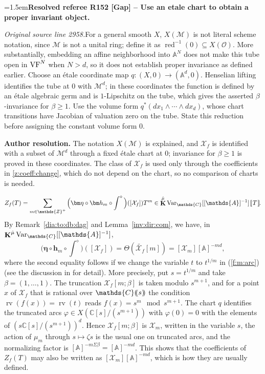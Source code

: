 \documentclass[12pt]{amsart}
\newcommand{\ResolvedRefereeRemark}[5]{%
  \par\medskip\begingroup\normalfont\small\color{gray}%
  \emergencystretch=1.5em\noindent\textbf{Resolved referee R#1 [#2] -- #3.}\par\nobreak\noindent #4\par
  \medskip\color{ResolutionGreen}\noindent\textbf{Author resolution.} #5\par
  \endgroup\medskip
}
\theoremstyle{plain}
\theoremstyle{definition}
\theoremstyle{remark}
\numberwithin{equation}{section}
\theoremstyle{plain}
\newcommand{\VF}{\textup{VF}}
\newcommand{\MM}{\mdl M}
\newcommand{\OO}{\mdl O}
\newcommand{\Z}{\mathds{Z}}
\newcommand{\A}{\mathds{A}}
\newcommand{\C}{\mathds{C}}
\newcommand{\0}{\emptyset}
\newcommand{\dbra}[1]{%
  \,[\mkern-6.8mu[\, #1 \,]\mkern-6.8mu]}
\newcommand{\dpar}[1]{%
   (\mkern-4mu (#1 )\mkern-4mu )}
\newcommand{\mdl}[1]{\mathcal{#1}}  %
\newcommand{\efun}{\longmapsto}
\DeclareMathOperator{\rv}{rv}
\DeclareMathOperator{\ggk}{\mathbf{K}}
\newcommand{\var}{\textup{Var}}
\newcommand{\gmv}{\ggk^{\hat \mu}\var_{\C}}
\begin{document}
\ResolvedRefereeRemark{152}{Gap}{Use an etale chart to obtain a proper invariant object}{%
\textit{Original source line 2958.}\quad For a general smooth $X$, $X(\MM)$ is not literal scheme notation, since $\MM$ is not a unital ring; define it as $\operatorname{red}^{-1}(0)\subseteq X(\OO)$. More substantially, embedding an affine neighborhood into $\A^N$ does not make this tube open in $\VF^N$ when $N>d$, so it does not establish proper invariance as defined earlier. Choose an \'etale coordinate map $q:(X,0)\to(\A^d,0)$. Henselian lifting identifies the tube at $0$ with $\MM^d$; in these coordinates the function is defined by an \'etale algebraic germ and is $1$-Lipschitz on the tube, which gives the asserted $\beta$-invariance for $\beta\geq1$. Use the volume form $q^*(dx_1\wedge\cdots\wedge dx_d)$, whose chart transitions have Jacobian of valuation zero on the tube. State this reduction before assigning the constant volume form $0$.
}{The notation $X(\MM)$ is explained, and $\mdl X_f$ is identified with a subset of $\MM^d$ through a fixed \'etale chart at $0$; invariance for $\beta\geq1$ is proved in these coordinates. The class of $\mdl X_f$ is used only through the coefficients in \eqref{z:coeff:change}, which do not depend on the chart, so no comparison of charts is needed.}
\begin{equation}\label{def:zeta}
Z_f(T) = \sum_{m \in \Z^+} \Big(\bm \eta \circ \bm h_m \circ \int^{\diamond} \Big)([\mdl X_f]) T^m \in \gmv[[\A]^{-1}] \dbra T.
\end{equation}
By Remark~\ref{dia:to:db:dag} and Lemma~\ref{inv:dir:com}, we have, in $\gmv[[\A]^{-1}]$,
\begin{equation}\label{z:coeff:change}
 \Big(\bm \eta \circ \bm h_m \circ \int^{\diamond} \Big)([\mdl X_f]) = \Theta(\tilde{\mdl X_f}[m]) = [\mdl X_{m}][\A]^{-md},
\end{equation}
where the second equality follows if  we change the variable $t$ to $t^{1/m}$ in (\ref{f:m:arc}) (see the discussion in \cite[\S~6.2]{hru:loe:lef} for  detail). More precisely, put $s = t^{1/m}$ and take $\beta = (1, \ldots, 1)$. The truncation $\mdl X_f[m;\beta]$ is taken modulo $s^{m+1}$, and for a point $x$ of $\mdl X_f$ that is rational over $\C \dpar{s}$ the condition $\rv(f(x)) = \rv(t)$ reads $f(x) = s^m \mod s^{m+1}$. The chart $q$ identifies the truncated arcs $\varphi \in X(\C[s]/(s^{m+1}))$ with $\varphi(0) = 0$ with the elements of $(s\C[s]/(s^{m+1}))^d$. Hence $\mdl X_f[m;\beta]$ is $\mdl X_m$, written in the variable $s$, the action of $\mu_m$ through $s \efun \zeta s$ is the usual one on truncated arcs, and the normalizing factor is $[\A]^{-m \Sigma \beta} = [\A]^{-md}$. This shows that the coefficients of $Z_f(T)$ may also be written as $[\mdl X_{m}][\A]^{-md}$, which is how they are usually defined.
\end{document}
